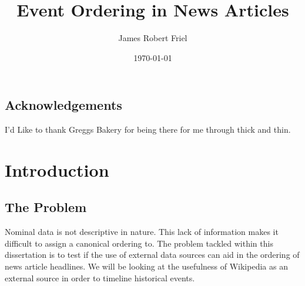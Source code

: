 \documentclass[bsc,frontabs,twoside,singlespacing,parskip,deptreport]{infthesis}     %
\begin{document}
\title{Event Ordering in News Articles}

\author{James Robert Friel}


\date{\today}

\abstract{}


\maketitle

\section*{Acknowledgements}
I'd Like to thank Greggs Bakery for being there for me through thick and thin.

\tableofcontents



\chapter{Introduction}
\section{The Problem}
Nominal data is not descriptive in nature. This lack of information makes it difficult to assign
a canonical ordering to.
The problem tackled within this dissertation is to test if the use of external data sources can
aid in the ordering of news article headlines.
We will be looking at the usefulness of Wikipedia as an external source in order to timeline
historical events.
\end{document}
